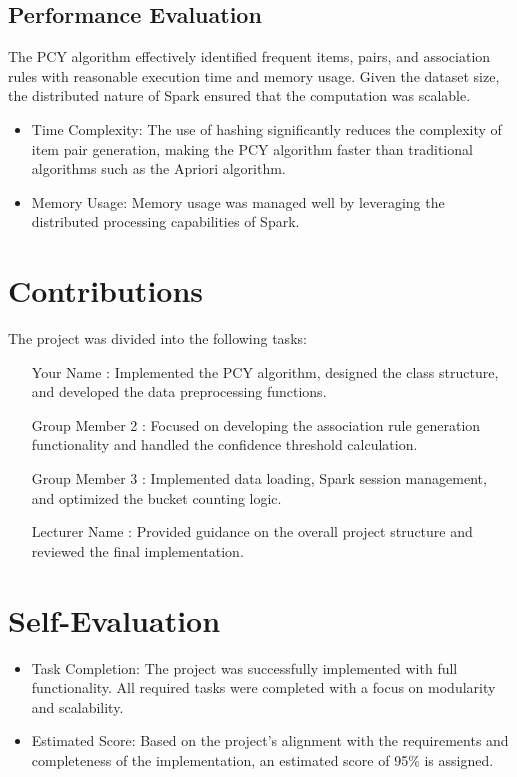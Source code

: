\documentclass{article}
\begin{document}
\subsection{Performance Evaluation}
The PCY algorithm effectively identified frequent items, pairs, and association rules with reasonable execution time and memory usage. Given the dataset size, the distributed nature of Spark ensured that the computation was scalable.
\begin{itemize}
    \item Time Complexity: The use of hashing significantly reduces the complexity of item pair generation, making the PCY algorithm faster than traditional algorithms such as the Apriori algorithm.
    \item Memory Usage: Memory usage was managed well by leveraging the distributed processing capabilities of Spark.
\end{itemize}

\section{Contributions}
The project was divided into the following tasks:
\begin{itemize}
    \item [Your Name]: Implemented the PCY algorithm, designed the class structure, and developed the data preprocessing functions.
    \item [Group Member 2]: Focused on developing the association rule generation functionality and handled the confidence threshold calculation.
    \item [Group Member 3]: Implemented data loading, Spark session management, and optimized the bucket counting logic.
    \item [Lecturer Name]: Provided guidance on the overall project structure and reviewed the final implementation.
\end{itemize}

\section{Self-Evaluation}
\begin{itemize}
    \item Task Completion: The project was successfully implemented with full functionality. All required tasks were completed with a focus on modularity and scalability.
    \item Estimated Score: Based on the project’s alignment with the requirements and completeness of the implementation, an estimated score of 95\% is assigned.
\end{itemize}
\end{document}
